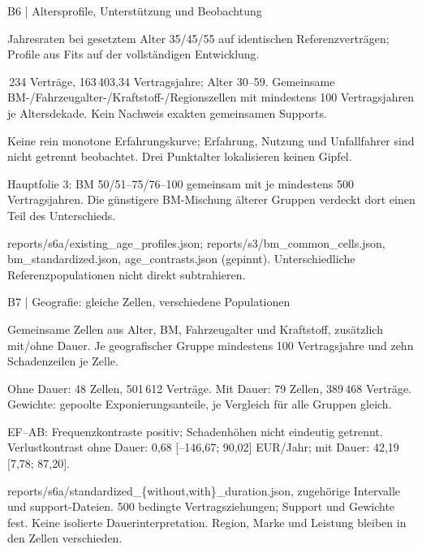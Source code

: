 \documentclass[aspectratio=169,11pt]{beamer}
\newcommand{\source}[1]{\vfill{\fontsize{6.5}{7.4}\selectfont\color{muted}#1\par}}
\newcommand{\smalltext}{\fontsize{9}{11.3}\selectfont}
\begin{document}
\begin{frame}[t]{B6 | Altersprofile, Unterstützung und Beobachtung}
\begin{center}\small\AgeProfileTable\end{center}
\smalltext Jahresraten bei gesetztem Alter 35/45/55 auf identischen Referenzverträgen;
Profile aus Fits auf der vollständigen Entwicklung.\par{}\,234 Verträge, 163\,403,34 Vertragsjahre; Alter 30--59.
Gemeinsame BM-/Fahrzeugalter-/Kraftstoff-/Regionszellen mit mindestens 100 Vertragsjahren je Altersdekade.
Kein Nachweis exakten gemeinsamen Supports.\par\smallskip
Keine rein monotone Erfahrungskurve; Erfahrung, Nutzung und Unfallfahrer sind nicht getrennt beobachtet.
Drei Punktalter lokalisieren keinen Gipfel.\par\smallskip
Hauptfolie 3: BM 50/51--75/76--100 gemeinsam mit je mindestens 500 Vertragsjahren.
Die günstigere BM-Mischung älterer Gruppen verdeckt dort einen Teil des Unterschieds.
\source{reports/s6a/existing\_age\_profiles.json; reports/s3/bm\_common\_cells.json, bm\_standardized.json, age\_contrasts.json (gepinnt).
Unterschiedliche Referenzpopulationen nicht direkt subtrahieren.}
\end{frame}

\begin{frame}[t]{B7 | Geografie: gleiche Zellen, verschiedene Populationen}
\begin{center}\small\StandardTable\end{center}
\smalltext Gemeinsame Zellen aus Alter, BM, Fahrzeugalter und Kraftstoff,
zusätzlich mit/ohne Dauer. Je geografischer Gruppe mindestens 100 Vertragsjahre und zehn Schadenzeilen je Zelle.\par\medskip
Ohne Dauer: 48 Zellen, 501\,612 Verträge. Mit Dauer: 79 Zellen, 389\,468 Verträge.
Gewichte: gepoolte Exponierungsanteile, je Vergleich für alle Gruppen gleich.\par\smallskip
EF--AB: Frequenzkontraste positiv; Schadenhöhen nicht eindeutig getrennt.
Verlustkontrast ohne Dauer: 0,68 [--146,67; 90,02] EUR/Jahr;
mit Dauer: 42,19 [7,78; 87,20].
\source{reports/s6a/standardized\_\{without,with\}\_duration.json, zugehörige Intervalle und support-Dateien.
500 bedingte Vertragsziehungen; Support und Gewichte fest. Keine isolierte Dauerinterpretation.
Region, Marke und Leistung bleiben in den Zellen verschieden.}
\end{frame}
\end{document}
